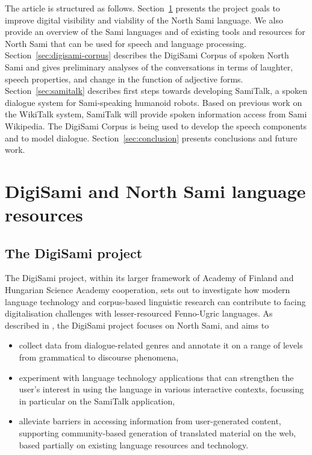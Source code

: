 \documentclass[runningheads,a4paper]{llncs}
\begin{document}
The article is structured as follows.
Section~\ref{sec:digisami} presents the project goals to improve digital visibility and viability of the North Sami language. We also provide an overview of the Sami languages and of existing tools and resources for North Sami that can be used for speech and language processing.
Section~\ref{sec:digisami-corpus} describes the DigiSami Corpus of spoken North Sami and gives preliminary analyses of the conversations in terms of laughter, speech properties, and change in the function of adjective forms.
Section~\ref{sec:samitalk} describes first steps towards developing SamiTalk, a spoken dialogue system for Sami-speaking humanoid robots. Based on previous work on the WikiTalk system, SamiTalk will provide spoken information access from Sami Wikipedia. The DigiSami Corpus is being used to develop the speech components and to model dialogue.
Section~\ref{sec:conclusion} presents conclusions and future work.

\section{DigiSami and North Sami language resources}
\label{sec:digisami}

\subsection{The DigiSami project}
\label{sec:digisamiproject}

The DigiSami project, within its larger framework of Academy of Finland and Hungarian Science Academy cooperation, sets out to investigate how modern language technology and corpus-based linguistic research can contribute to facing digitalisation challenges with lesser-resourced Fenno-Ugric languages.
As described in \cite{Jokinen:LREC:14}, the DigiSami project focuses on North Sami, and aims to
\begin{itemize}
\item collect data from dialogue-related genres and annotate it on a range of levels from grammatical to discourse phenomena,
\item experiment with language technology applications that can strengthen the user's interest in using the language in various interactive contexts, focussing in particular on the SamiTalk application,
\item alleviate barriers in accessing information from user-generated content, supporting community-based generation of translated material on the web, based partially on existing language resources and technology.
\end{itemize}
\end{document}
